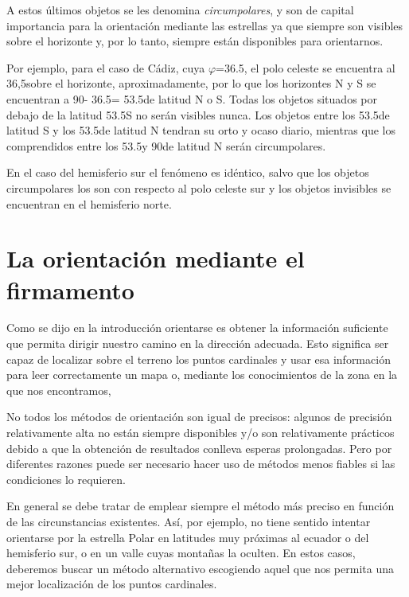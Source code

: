 \documentclass[11pt,a5paper,twoside]{amsbook}
\begin{document}
A estos últimos objetos se les denomina \textit{circumpolares}, y son de capital importancia para la orientación mediante las estrellas ya que siempre son visibles sobre el horizonte y, por lo tanto, siempre están disponibles para orientarnos.

Por ejemplo, para el caso de Cádiz, cuya $\varphi$=36.5\textdegree, el polo celeste se encuentra al 36,5\textdegree sobre el horizonte, aproximadamente, por lo que los horizontes N y S se encuentran a  90\textdegree - 36.5\textdegree = 53.5\textdegree de latitud N o S. Todas los objetos situados por debajo de la latitud 53.5\textdegree S no serán visibles nunca. Los objetos entre los 53.5\textdegree de latitud S y los 53.5\textdegree de latitud N tendran su orto y ocaso diario, mientras que los comprendidos entre los 53.5\textdegree y 90\textdegree de latitud N serán circumpolares.

En el caso del hemisferio sur el fenómeno es idéntico, salvo que los objetos circumpolares los son con respecto al polo celeste sur y los objetos invisibles se encuentran en el hemisferio norte.

\section{La orientación mediante el firmamento}

Como se dijo en la introducción orientarse es obtener la información suficiente que permita  dirigir nuestro camino en la dirección adecuada. Esto significa ser capaz de localizar sobre el terreno los puntos cardinales y usar esa información para leer correctamente un mapa o, mediante los conocimientos de la zona en la que nos encontramos,

No todos los métodos de orientación son igual de precisos: algunos de precisión relativamente alta no están siempre disponibles y/o son relativamente prácticos debido a que la obtención de resultados conlleva esperas prolongadas. Pero por diferentes razones puede ser necesario hacer uso de métodos menos fiables si las condiciones lo requieren.

En general se debe tratar de emplear siempre el método más preciso en función de las circunstancias existentes. Así, por ejemplo, no tiene sentido intentar orientarse por la estrella Polar en latitudes muy próximas al ecuador o del hemisferio sur, o en un valle cuyas montañas la oculten. En estos casos, deberemos buscar un método alternativo escogiendo aquel que nos permita una mejor localización de los puntos cardinales.
\end{document}
